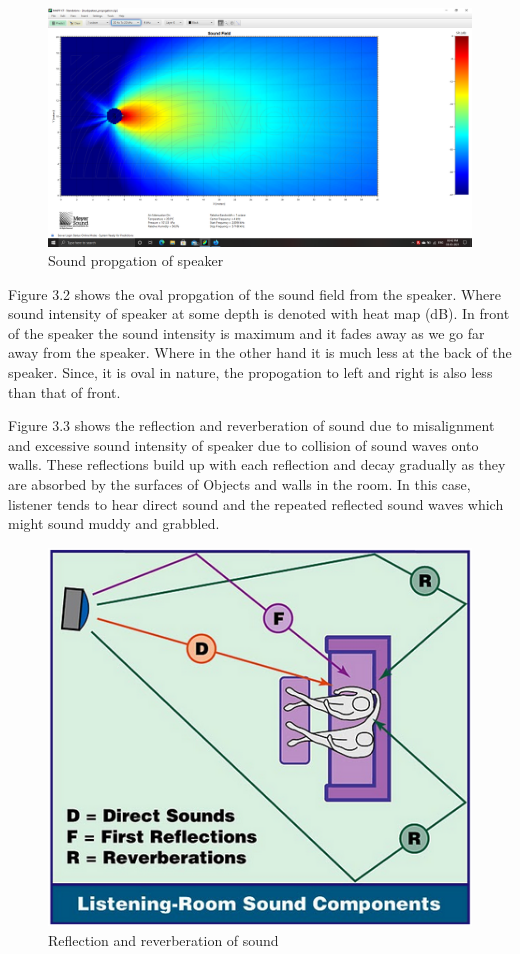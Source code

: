 \documentclass[twocolumn]{report}
\begin{document}
\begin{figure}[ht]
    \includegraphics[width=1\textwidth]{sound_propogation_for_speaker.png}
    \caption{Sound propgation of speaker}
\end{figure}

\FloatBarrier

Figure 3.2 shows the oval propgation of the sound field from the speaker. Where sound
intensity of speaker at some depth is denoted with heat map (dB). In front of the speaker
the sound intensity is maximum and it fades away as we go far away from the speaker. Where 
in the other hand it is much less at the back of the speaker. Since, it is oval in nature, 
the propogation to left and right is also less than that of front.

Figure 3.3 shows the reflection and reverberation of sound due to misalignment
and excessive sound intensity of speaker due to collision of sound waves onto walls. 
These reflections build up with each reflection and decay gradually as they are absorbed by the surfaces of Objects and walls
in the room. In this case, listener tends to hear direct sound and the repeated
reflected sound waves which might sound muddy and grabbled.

\begin{figure}
    \includegraphics[width=\columnwidth]{reverberation.png}
    \caption{Reflection and reverberation of sound}
\end{figure}
\end{document}
